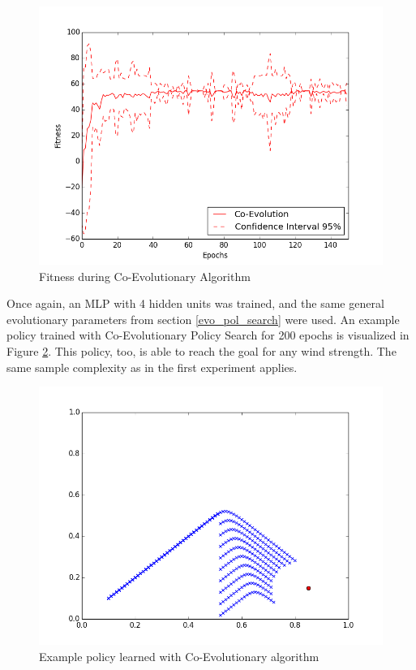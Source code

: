 \begin{figure}[ht]
  \centering
  \includegraphics[scale=0.5]{images/co_evo.png}
  \caption{Fitness during Co-Evolutionary Algorithm}\label{Fitness during Co-Evolutionary Algorithm}
\end{figure}

Once again, an MLP with 4 hidden units was trained, and the same general evolutionary parameters from section \ref{evo_pol_search} were used. An example policy trained with Co-Evolutionary Policy Search for 200 epochs is visualized in Figure \ref{Example policy learned with Co-Evolutionary algorithm}. This policy, too, is able to reach the goal for any wind strength. The same sample complexity as in the first experiment applies.

\begin{figure}[ht]
  \centering
  \includegraphics[scale=0.5]{images/co_evo_result.png}
  \caption{Example policy learned with Co-Evolutionary algorithm}\label{Example policy learned with Co-Evolutionary algorithm}
\end{figure}


